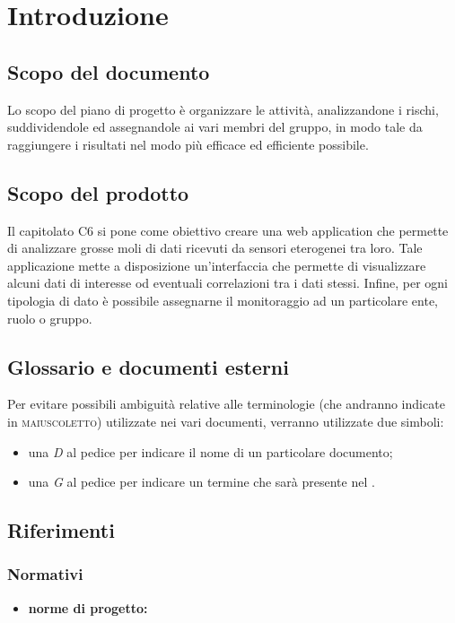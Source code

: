 \section{Introduzione}

	\subsection{Scopo del documento}
		Lo scopo del piano di progetto è organizzare le attività, analizzandone i rischi, suddividendole ed assegnandole ai vari membri del gruppo, in modo tale da raggiungere i risultati nel modo più efficace ed efficiente possibile.
	\subsection{Scopo del prodotto}
		Il capitolato C6 si pone come obiettivo creare una web application che permette di analizzare grosse moli di dati ricevuti da sensori eterogenei tra loro. Tale applicazione mette a disposizione un'interfaccia che permette di visualizzare alcuni dati di interesse od eventuali correlazioni tra i dati stessi. Infine, per ogni tipologia di dato è possibile assegnarne il monitoraggio ad un particolare ente, ruolo o gruppo.
	\subsection{Glossario e documenti esterni}
		Per evitare possibili ambiguità relative alle terminologie (che andranno indicate in \textsc{maiuscoletto}) utilizzate nei vari documenti, verranno utilizzate due simboli:
		\begin{itemize}
			\item una \textit{D} al pedice per indicare il nome di un particolare documento;
			\item una \textit{G} al pedice per indicare un termine che sarà presente nel .
		\end{itemize}
	\subsection{Riferimenti}
		\subsubsection{Normativi}
		\begin{itemize}
			\item \textbf{norme di progetto:} 
		\end{itemize}

